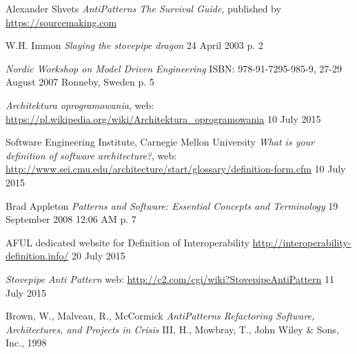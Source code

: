 \begin{thebibliography}{9}
     
    Alexander Shvets
    \emph{AntiPatterns The Survival Guide},
    published by \url{https://sourcemaking.com}
    
    W.H. Immon
    \emph{Slaying the stovepipe dragon}
    24 April 2003
    p. 2
    
    \emph{Nordic Workshop on Model Driven Engineering}
    ISBN: 978-91-7295-985-9,
    27-29 August 2007 Ronneby, Sweden
    p. 5
    
    \emph{Architektura oprogramowania},
    web: \url{https://pl.wikipedia.org/wiki/Architektura_oprogramowania}
    10 July 2015
    
    Software Engineering Institute, Carnegie Mellon University
    \emph{What is your definition of software architecture?},
    web: \url{http://www.sei.cmu.edu/architecture/start/glossary/definition-form.cfm}
    10 July 2015
    
     Brad Appleton
     \emph{Patterns and Software: Essential Concepts and Terminology}
     19 September 2008 12:06 AM
     p. 7
     
    AFUL dedicated website for Definition of Interoperability
    \url{http://interoperability-definition.info/}
    20 July 2015
     
    \emph{Stovepipe Anti Pattern}
    web: \url{http://c2.com/cgi/wiki?StovepipeAntiPattern}
    11 July 2015
    
    Brown, W., Malveau, R., McCormick
    \emph{AntiPatterns Refactoring Software, Architectures, and Projects in Crisis}
    III, H., Mowbray, T., John Wiley \& Sons, Inc., 1998
    

\end{thebibliography}